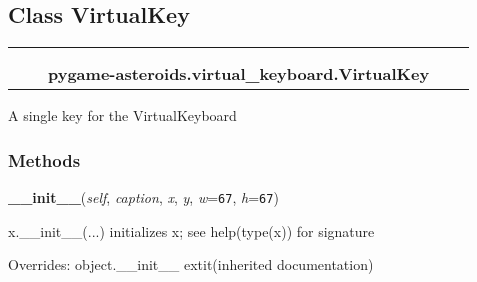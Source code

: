 \subsection{Class VirtualKey}

    \label{pygame-asteroids:virtual_keyboard:VirtualKey}
\begin{tabular}{cccccc}
\multicolumn{2}{r}{\settowidth{\BCL}{object}\multirow{2}{\BCL}{object}}
&&
  \\\cline{3-3}
  &&\multicolumn{1}{c|}{}
&&
  \\
&&\multicolumn{2}{l}{\textbf{pygame-asteroids.virtual\_keyboard.VirtualKey}}
\end{tabular}

A single key for the VirtualKeyboard



  \subsubsection{Methods}

    \vspace{0.5ex}

\hspace{.8\funcindent}\begin{boxedminipage}{\funcwidth}

    \raggedright \textbf{\_\_init\_\_}(\textit{self}, \textit{caption}, \textit{x}, \textit{y}, \textit{w}={\tt 67}, \textit{h}={\tt 67})

\setlength{\parskip}{2ex}
    x.\_\_init\_\_(...) initializes x; see help(type(x)) for signature

\setlength{\parskip}{1ex}
      Overrides: object.\_\_init\_\_ 	extit{(inherited documentation)}

    \end{boxedminipage}

    \label{pygame-asteroids:virtual_keyboard:VirtualKey:draw}

